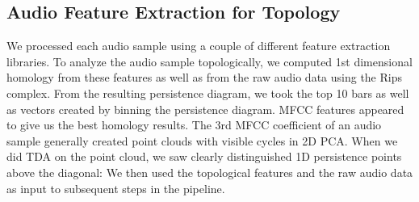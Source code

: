 \documentclass[12pt]{article}
\begin{document}
\subsection{Audio Feature Extraction for Topology}
\-\hspace{1cm} We processed each audio sample using a couple of different
feature extraction libraries. To analyze the audio sample topologically, we
computed 1st dimensional homology from these features as well as from the raw
audio data using the Rips complex. From the resulting persistence diagram, we
took the top 10 bars as well as vectors created by binning the persistence
diagram.
\newline \-\hspace{1cm} MFCC features appeared to give us the best homology
results. The 3rd MFCC coefficient of an audio sample generally created point
clouds with visible cycles in 2D PCA. When we did TDA on the point cloud, we
saw clearly distinguished 1D persistence points above the diagonal:
\newline \-\hspace{1cm} We then used the topological features and the raw audio
data as input to subsequent steps in the pipeline.
\end{document}
